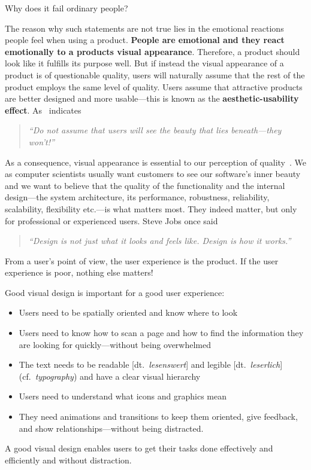 Why does it fail ordinary people?

The reason why such statements are not true lies in the emotional reactions people feel when using a product. \textbf{People are emotional and they react emotionally to a products visual appearance}. 
Therefore, a product should look like it fulfills its purpose well.
But if instead the visual appearance of a product is of questionable quality, users will naturally assume that the rest of the product employs the same level of quality. 
Users assume that attractive products are better designed and more usable---this is known as the \textbf{aesthetic-usability effect}. As~\citep{mckay:2013} indicates 
\begin{quote}
	\emph{``Do not assume that users will see the beauty that lies beneath---they won't!''}
\end{quote}

As a consequence, visual appearance is essential to our perception of quality~.
We as computer scientists usually want customers to see our software's inner beauty and we want to believe that the quality of the functionality and the internal design---the system architecture, its performance, robustness, reliability, scalability, flexibility etc.---is what matters most. 
They indeed matter, but only for professional or experienced users.
Steve Jobs once said
\begin{quote}
	\emph{``Design is not just what it looks and feels like. Design is how it works.''}
\end{quote}
From a user's point of view, the user experience is the product.
If the user experience is poor, nothing else matters!

\noindent Good visual design is important for a good user experience:
\begin{itemize}
	\item Users need to be spatially oriented and know where to look
	\item Users need to know how to scan a page and how to find the information they are looking for quickly---without being overwhelmed 
	\item The text needs to be readable [dt.~\emph{lesenswert}] and legible [dt.~\emph{leserlich}] (cf.~\emph{typography}) and have a clear visual hierarchy
	\item Users need to understand what icons and graphics mean
	\item They need animations and transitions to keep them oriented, give feedback, and show relationships---without being distracted.
\end{itemize}
A good visual design enables users to get their tasks done effectively and efficiently and without distraction. 


